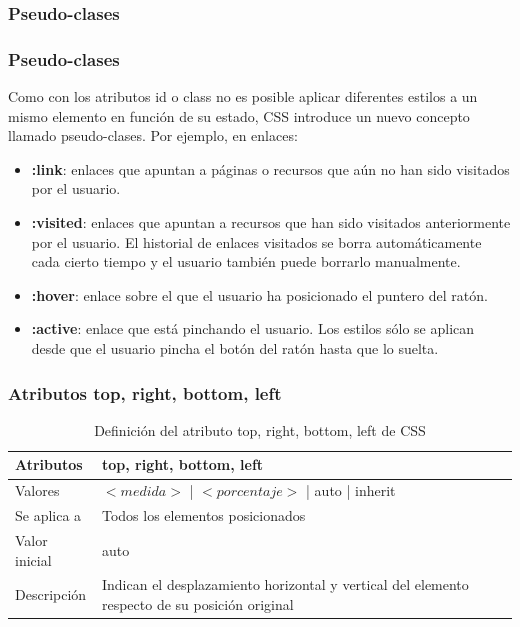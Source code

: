 \documentclass[ucs]{beamer}
\begin{document}
\subsubsection*{Pseudo-clases}

\begin{frame}
\frametitle{Pseudo-clases}

Como con los atributos id o class no es posible aplicar diferentes estilos a un mismo elemento en función de su estado, CSS introduce un nuevo concepto llamado pseudo-clases. Por ejemplo, en enlaces:

\begin{itemize}
  \item {\bf :link}: enlaces que apuntan a páginas o recursos que aún no han sido visitados por el usuario.
  \item {\bf :visited}: enlaces que apuntan a recursos que han sido visitados anteriormente por el usuario. El historial de enlaces visitados se borra automáticamente cada cierto tiempo y el usuario también puede borrarlo manualmente.
  \item {\bf :hover}: enlace sobre el que el usuario ha posicionado el puntero del ratón.
  \item {\bf :active}: enlace que está pinchando el usuario. Los estilos sólo se aplican desde que el usuario pincha el botón del ratón hasta que lo suelta.
\end{itemize}

\end{frame}




\begin{frame}
\frametitle{Atributos top, right, bottom, left}

\begin{center}
  \begin{table}
   \begin{tabular}{p{1.8cm}p{7.8cm}}
Atributos& {\bf top}, {\bf right}, {\bf bottom}, {\bf left} \\ \hline
Valores& $<medida>$ | $<porcentaje>$ | auto | inherit \\ \hline
Se aplica a& Todos los elementos posicionados \\ \hline
Valor inicial& auto \\ \hline
Descripción& Indican el desplazamiento horizontal y vertical del elemento respecto de su posición original \\ \hline
  \end{tabular}
   \caption{Definición del atributo top, right, bottom, left de CSS}
 \end{table}
\end{center}


\end{frame}
\end{document}
